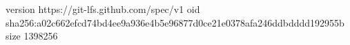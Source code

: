 version https://git-lfs.github.com/spec/v1
oid sha256:a02c662efcd74bd4ee9a936e4b5e96877d0ce21e0378afa246ddbdddd192955b
size 1398256
